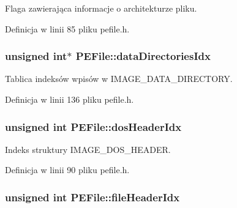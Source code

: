 Flaga zawierająca informacje o architekturze pliku. 



Definicja w linii 85 pliku pefile.\-h.

\hypertarget{class_p_e_file_acc624dc6b876fbfb22e7fe2114c36bdd}{
\subsubsection[{data\-Directories\-Idx}]{\setlength{\rightskip}{0pt plus 5cm}unsigned int$\ast$ P\-E\-File\-::data\-Directories\-Idx\hspace{0.3cm}{\ttfamily [private]}}}\label{class_p_e_file_acc624dc6b876fbfb22e7fe2114c36bdd}


Tablica indeksów wpisów w I\-M\-A\-G\-E\-\_\-\-D\-A\-T\-A\-\_\-\-D\-I\-R\-E\-C\-T\-O\-R\-Y. 



Definicja w linii 136 pliku pefile.\-h.

\hypertarget{class_p_e_file_aa813f4eef94aa75a0b537515b7253293}{
\subsubsection[{dos\-Header\-Idx}]{\setlength{\rightskip}{0pt plus 5cm}unsigned int P\-E\-File\-::dos\-Header\-Idx\hspace{0.3cm}{\ttfamily [private]}}}\label{class_p_e_file_aa813f4eef94aa75a0b537515b7253293}


Indeks struktury I\-M\-A\-G\-E\-\_\-\-D\-O\-S\-\_\-\-H\-E\-A\-D\-E\-R. 



Definicja w linii 90 pliku pefile.\-h.

\hypertarget{class_p_e_file_a1e3de62b90006b727516b9216c19af56}{
\subsubsection[{file\-Header\-Idx}]{\setlength{\rightskip}{0pt plus 5cm}unsigned int P\-E\-File\-::file\-Header\-Idx\hspace{0.3cm}{\ttfamily [private]}}}\label{class_p_e_file_a1e3de62b90006b727516b9216c19af56}


